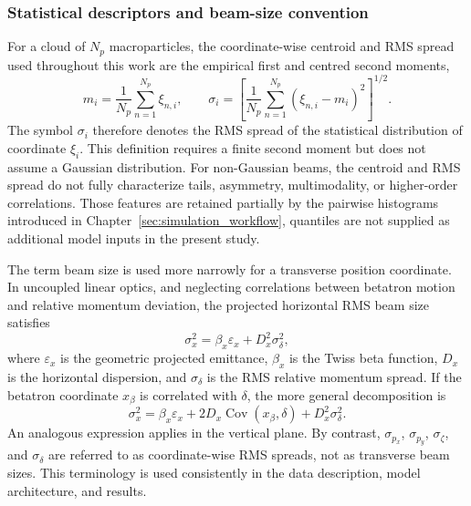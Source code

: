 \subsubsection{Statistical descriptors and beam-size convention}
\label{subsubsec:beam_descriptors_definition}

For a cloud of $N_p$ macroparticles, the coordinate-wise centroid and RMS spread used throughout this work are the empirical first and centred second moments,
\begin{equation}
    m_i
    =
    \frac{1}{N_p}
    \sum_{n=1}^{N_p}\xi_{n,i},
    \qquad
    \sigma_i
    =
    \left[
        \frac{1}{N_p}
        \sum_{n=1}^{N_p}
        \left(\xi_{n,i}-m_i\right)^2
    \right]^{1/2}.
    \label{eq:empirical_centroid_rms_definition}
\end{equation}
The symbol $\sigma_i$ therefore denotes the RMS spread of the statistical distribution of coordinate $\xi_i$. This definition requires a finite second moment but does not assume a Gaussian distribution. For non-Gaussian beams, the centroid and RMS spread do not fully characterize tails, asymmetry, multimodality, or higher-order correlations. Those features are retained partially by the pairwise histograms introduced in Chapter~\ref{sec:simulation_workflow}, quantiles are not supplied as additional model inputs in the present study.

The term beam size is used more narrowly for a transverse position coordinate. In uncoupled linear optics, and neglecting correlations between betatron motion and relative momentum deviation, the projected horizontal RMS beam size satisfies
\begin{equation}
    \sigma_x^2
    =
    \beta_x\varepsilon_x
    +
    D_x^2\sigma_{\delta}^2,
    \label{eq:conventional_transverse_beam_size}
\end{equation}
where $\varepsilon_x$ is the geometric projected emittance, $\beta_x$ is the Twiss beta function, $D_x$ is the horizontal dispersion, and $\sigma_{\delta}$ is the RMS relative momentum spread. If the betatron coordinate $x_{\beta}$ is correlated with $\delta$, the more general decomposition is
\begin{equation}
    \sigma_x^2
    =
    \beta_x\varepsilon_x
    +
    2D_x\operatorname{Cov}(x_{\beta},\delta)
    +
    D_x^2\sigma_{\delta}^2.
    \label{eq:general_transverse_beam_size}
\end{equation}
An analogous expression applies in the vertical plane. By contrast, $\sigma_{p_x}$, $\sigma_{p_y}$, $\sigma_{\zeta}$, and $\sigma_{\delta}$ are referred to as coordinate-wise RMS spreads, not as transverse beam sizes. This terminology is used consistently in the data description, model architecture, and results.

